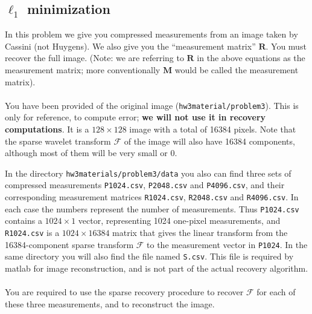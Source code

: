 \subsection{$\ell_1$ minimization}

In this problem we give you compressed measurements from an image taken by Cassini (not Huygens).  We also give you the ``measurement matrix'' $\mathbf{R}$. You must recover the full image. (Note: we are referring to $\mathbf{R}$ in the above equations as the measurement matrix; more conventionally $\mathbf{M}$ would be called the measurement matrix).
\\
\\
You have been provided of the original image (\texttt{hw3material/problem3}). This is only for reference, to compute error; \textbf{we will not use it in recovery computations}. It is a $128 \times 128$ image with a total of 16384 pixels. Note that the sparse wavelet transform $\mathcal{F}$ of the image will also have 16384 components, although most of them will be very small or 0. 

In the directory \texttt{hw3materials/problem3/data} you also can find  three sets of compressed measurements \texttt{P1024.csv}, \texttt{P2048.csv} and \texttt{P4096.csv}, and their corresponding measurement matrices \texttt{R1024.csv},  \texttt{R2048.csv} and  \texttt{R4096.csv}.  In each case the numbers represent the  number of measurements. Thus \texttt{P1024.csv} contains a $1024 \times 1$ vector, representing 1024 one-pixel measurements, and \texttt{R1024.csv} is a $1024 \times 16384$ matrix that gives the linear transform from the 16384-component sparse transform $\mathcal{F}$ to the measurement vector in \texttt{P1024}. In the same directory you will also find the file named \texttt{S.csv}. This file is required by matlab for image reconstruction, and is not part of the actual recovery algorithm. 
\\
\\
You are required to use the sparse recovery procedure to recover $\mathcal{F}$ for each of these three measurements, and to reconstruct the image.


